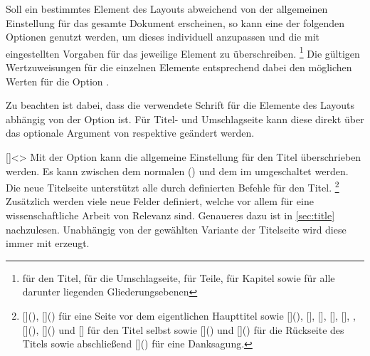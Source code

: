 \begin{Declaration*}{}
\begin{Declaration*}{}
\begin{Declaration*}{}
Soll ein bestimmtes Element des Layouts abweichend von der allgemeinen 
Einstellung für das gesamte Dokument erscheinen, so kann eine der folgenden 
Optionen genutzt werden, um dieses individuell anzupassen und die mit 
 eingestellten Vorgaben für das jeweilige Element zu 
überschreiben.%
\footnote{%
   für den Titel,  für die Umschlagseite,
   für Teile,  für Kapitel sowie
   für alle darunter liegenden Gliederungsebenen%
}
Die gültigen Wertzuweisungen für die einzelnen Elemente entsprechend dabei den 
möglichen Werten für die Option . 

Zu beachten ist dabei, dass die verwendete Schrift für die Elemente des Layouts 
abhängig von der Option  ist. Für Titel- und Umschlagseite 
kann diese direkt über das optionale Argument von  respektive 
 geändert werden.

\begin{Declaration}[%
  v2.03!\Option{cdtitle=bicolor}:%
    Farbeinsatz nur im Kopf mit farbig abgesetztem Querbalken;
  v2.03!\Option{cdtitle=fullcolor}:%
    voller Farbeinsatz mit farbig abgesetztem Querbalken;
  v2.04!\Option{cdtitle=barcolor}:nur farbig abgesetzter Querbalken;%
]{}[]<\cdalias>
\printdeclarationlist%
%
%
Mit der Option  kann die allgemeine Einstellung für den Titel 
überschrieben werden. Es kann zwischen dem normalen () 
und dem im \CD umgeschaltet werden. Die neue Titelseite unterstützt alle durch 
\KOMAScript{} definierten Befehle für den Titel.%
\footnote{%
  [](),
  []() für eine 
  Seite vor dem eigentlichen Haupttitel sowie
  [](),
  [], [],
  [], [],
  , [](), 
  []() und 
  [] für den Titel selbst sowie 
  []()
  und
  []() 
  für die Rückseite des Titels sowie abschließend 
  []() für eine 
  Danksagung.
}
Zusätzlich werden viele neue Felder definiert, welche vor allem für eine 
wissenschaftliche Arbeit von Relevanz sind. Genaueres dazu 
ist in \autoref{sec:title} nachzulesen. Unabhängig von der gewählten Variante 
der Titelseite wird diese immer mit  erzeugt.
\end{Declaration}


\end{Declaration*}
\end{Declaration*}
\end{Declaration*}
